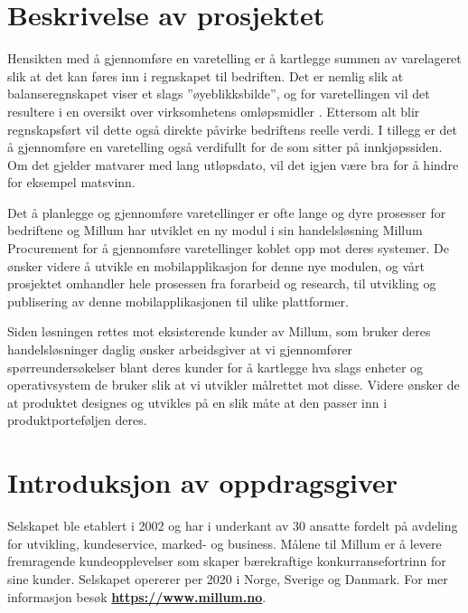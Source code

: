 \section{\textbf{Beskrivelse av prosjektet}}

 Hensikten med å gjennomføre en varetelling er å kartlegge summen av varelageret slik at det kan føres inn i regnskapet til bedriften. Det er nemlig slik at balanseregnskapet viser et slags ''øyeblikksbilde'', og for varetellingen vil det resultere i en oversikt over virksomhetens omløpsmidler . Ettersom alt blir regnskapsført vil dette også direkte påvirke bedriftens reelle verdi. I tillegg er det å gjennomføre en varetelling også verdifullt for de som sitter på innkjøpssiden. Om det gjelder matvarer med lang utløpsdato, vil det igjen være bra for å hindre for eksempel matsvinn.

Det å planlegge og gjennomføre varetellinger er ofte lange og dyre prosesser for bedriftene og Millum har utviklet en ny modul i sin handelsløsning Millum Procurement for å gjennomføre varetellinger koblet opp mot deres systemer. De ønsker videre å utvikle en mobilapplikasjon for denne nye modulen, og vårt prosjektet omhandler hele prosessen fra forarbeid og research, til utvikling og publisering av denne mobilapplikasjonen til ulike plattformer.

Siden løsningen rettes mot eksisterende kunder av Millum, som bruker deres handelsløsninger daglig ønsker arbeidsgiver at vi gjennomfører spørreundersøkelser blant deres kunder for å kartlegge hva slags enheter og operativsystem de bruker slik at vi utvikler målrettet mot disse. Videre ønsker de at produktet designes og utvikles på en slik måte at den passer inn i produktporteføljen deres.


\section{\textbf{Introduksjon av oppdragsgiver}}
 Selskapet ble etablert i 2002 og har i underkant av 30 ansatte fordelt på avdeling for utvikling, kundeservice, marked- og business. Målene til Millum er å levere fremragende kundeopplevelser som skaper bærekraftige konkurransefortrinn for sine kunder. Selskapet opererer per 2020 i Norge, Sverige og Danmark. For mer informasjon besøk \textbf{\url{https://www.millum.no}}.

